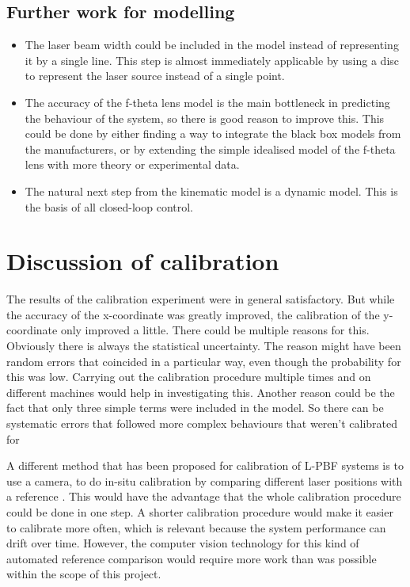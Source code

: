 \subsection{Further work for modelling}
\begin{itemize}
    \item The laser beam width could be included in the model instead of representing it by a single line. This step is almost immediately applicable by using a disc to represent the laser source instead of a single point.
    \item The accuracy of the f-theta lens model is the main bottleneck in predicting the behaviour of the system, so there is good reason to improve this. This could be done by either finding a way to integrate the black box models from the manufacturers, or by extending the simple idealised model of the f-theta lens with more theory or experimental data.
    \item The natural next step from the kinematic model is a dynamic model. This is the basis of all closed-loop control.
\end{itemize}

\section{Discussion of calibration} \label{sec:calibration-discussion}

The results of the calibration experiment were in general satisfactory. But while the accuracy of the x-coordinate was greatly improved, the calibration of the y-coordinate only improved a little. There could be multiple reasons for this. Obviously there is always the statistical uncertainty. The reason might have been random errors that coincided in a particular way, even though the probability for this was low. Carrying out the calibration procedure multiple times and on different machines would help in investigating this. Another reason could be the fact that only three simple terms were included in the model. So there can be systematic errors that followed more complex behaviours that weren't calibrated for

A different method that has been proposed for calibration of L-PBF systems is to use a camera, to do in-situ calibration by comparing different laser positions with a reference \cite{in-situ}. This would have the advantage that the whole calibration procedure could be done in one step. A shorter calibration procedure would make it easier to calibrate more often, which is relevant because the system performance can drift over time. However, the computer vision technology for this kind of automated reference comparison would require more work than was possible within the scope of this project.

